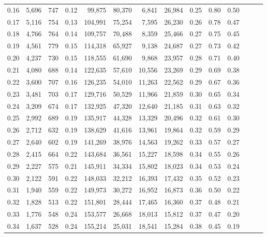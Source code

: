 \begin{tabular}{rrrrrrrrrrrrrr}
0.16 &  5,696 &  747 &  0.12 &   99,875 &   80,370 &   6,841 &  26,984 &  0.25 &  0.80 &      0.50 \\
0.17 &  5,116 &  754 &  0.13 &  104,991 &   75,254 &   7,595 &  26,230 &  0.26 &  0.78 &      0.47 \\
0.18 &  4,766 &  764 &  0.14 &  109,757 &   70,488 &   8,359 &  25,466 &  0.27 &  0.75 &      0.45 \\
0.19 &  4,561 &  779 &  0.15 &  114,318 &   65,927 &   9,138 &  24,687 &  0.27 &  0.73 &      0.42 \\
0.20 &  4,237 &  730 &  0.15 &  118,555 &   61,690 &   9,868 &  23,957 &  0.28 &  0.71 &      0.40 \\
0.21 &  4,080 &  688 &  0.14 &  122,635 &   57,610 &  10,556 &  23,269 &  0.29 &  0.69 &      0.38 \\
0.22 &  3,600 &  707 &  0.16 &  126,235 &   54,010 &  11,263 &  22,562 &  0.29 &  0.67 &      0.36 \\
0.23 &  3,481 &  703 &  0.17 &  129,716 &   50,529 &  11,966 &  21,859 &  0.30 &  0.65 &      0.34 \\
0.24 &  3,209 &  674 &  0.17 &  132,925 &   47,320 &  12,640 &  21,185 &  0.31 &  0.63 &      0.32 \\
0.25 &  2,992 &  689 &  0.19 &  135,917 &   44,328 &  13,329 &  20,496 &  0.32 &  0.61 &      0.30 \\
0.26 &  2,712 &  632 &  0.19 &  138,629 &   41,616 &  13,961 &  19,864 &  0.32 &  0.59 &      0.29 \\
0.27 &  2,640 &  602 &  0.19 &  141,269 &   38,976 &  14,563 &  19,262 &  0.33 &  0.57 &      0.27 \\
0.28 &  2,415 &  664 &  0.22 &  143,684 &   36,561 &  15,227 &  18,598 &  0.34 &  0.55 &      0.26 \\
0.29 &  2,227 &  575 &  0.21 &  145,911 &   34,334 &  15,802 &  18,023 &  0.34 &  0.53 &      0.24 \\
0.30 &  2,122 &  591 &  0.22 &  148,033 &   32,212 &  16,393 &  17,432 &  0.35 &  0.52 &      0.23 \\
0.31 &  1,940 &  559 &  0.22 &  149,973 &   30,272 &  16,952 &  16,873 &  0.36 &  0.50 &      0.22 \\
0.32 &  1,828 &  513 &  0.22 &  151,801 &   28,444 &  17,465 &  16,360 &  0.37 &  0.48 &      0.21 \\
0.33 &  1,776 &  548 &  0.24 &  153,577 &   26,668 &  18,013 &  15,812 &  0.37 &  0.47 &      0.20 \\
0.34 &  1,637 &  528 &  0.24 &  155,214 &   25,031 &  18,541 &  15,284 &  0.38 &  0.45 &      0.19 \\

\end{tabular}

